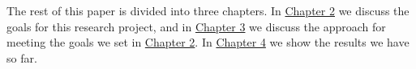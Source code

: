 The rest of this paper is divided into three chapters. In \hyperref[chp:Objectives]{Chapter 2} we discuss the goals for this research project, and in \hyperref[chp:Approach]{Chapter 3} we discuss the approach for meeting the goals we set in \hyperref[chp:Objectives]{Chapter 2}. In \hyperref[chp:Results]{Chapter 4} we show the results we have so far. %
\\

%
%
%			

